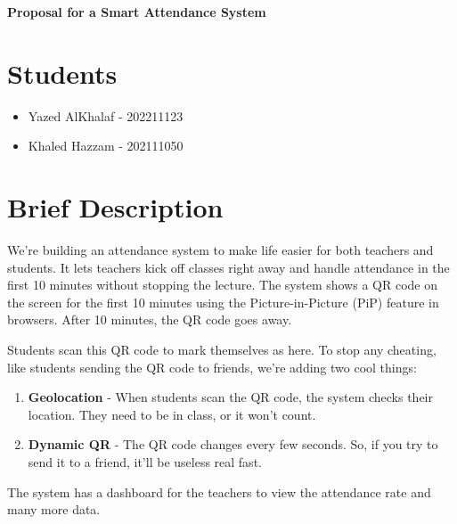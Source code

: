\documentclass[a4paper]{article}
\author{Yazed AlKhalaf, Khaled Hazzam}
\begin{document}
{\centering
{\Large\bfseries Proposal for a Smart Attendance System\par}
\vspace{2em}
}

\section{Students}

\begin{itemize}
    \item Yazed AlKhalaf - 202211123
    \item Khaled Hazzam - 202111050
\end{itemize}

\section{Brief Description}

We're building an attendance system to make life easier for both teachers and students. It lets teachers kick off classes right away and handle attendance in the first 10 minutes without stopping the lecture. The system shows a QR code on the screen for the first 10 minutes using the Picture-in-Picture (PiP) feature in browsers. After 10 minutes, the QR code goes away.

Students scan this QR code to mark themselves as here. To stop any cheating, like students sending the QR code to friends, we're adding two cool things:

\begin{enumerate}
    \item \textbf{Geolocation} - When students scan the QR code, the system checks their location. They need to be in class, or it won't count.
    \item \textbf{Dynamic QR} - The QR code changes every few seconds. So, if you try to send it to a friend, it'll be useless real fast.
\end{enumerate}

The system has a dashboard for the teachers to view the attendance rate and many more data.
\end{document}
